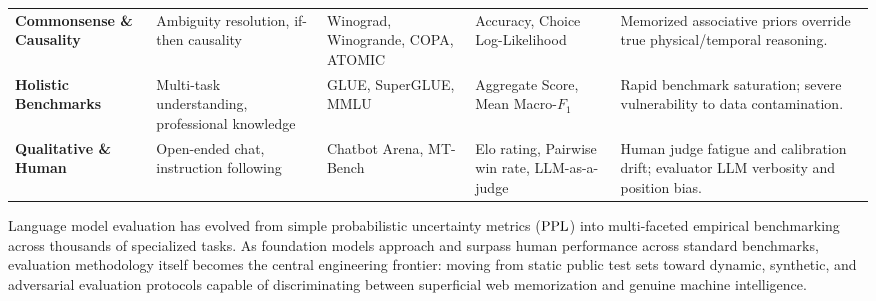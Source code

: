 \documentclass[../../main.tex]{subfiles}
\begin{document}
\begin{table}[htbp]
\begin{tabularx}{\textwidth}{l p{2.8cm} p{3.2cm} p{2.8cm} X}
\addlinespace
\textbf{Commonsense \& Causality} 
    & Ambiguity resolution, if-then causality & Winograd, Winogrande, COPA, ATOMIC & Accuracy, Choice Log-Likelihood & Memorized associative priors override true physical/temporal reasoning. \\
\addlinespace
\textbf{Holistic Benchmarks} 
    & Multi-task understanding, professional knowledge & GLUE, SuperGLUE, MMLU & Aggregate Score, Mean Macro-$F_1$ & Rapid benchmark saturation; severe vulnerability to data contamination. \\
\addlinespace
\textbf{Qualitative \& Human} 
    & Open-ended chat, instruction following & Chatbot Arena, MT-Bench & Elo rating, Pairwise win rate, LLM-as-a-judge & Human judge fatigue and calibration drift; evaluator LLM verbosity and position bias. \\
\bottomrule
\end{tabularx}
\end{table}


Language model evaluation has evolved from simple probabilistic uncertainty metrics ($\mathrm{PPL}$) into multi-faceted empirical benchmarking across thousands of specialized tasks. As foundation models approach and surpass human performance across standard benchmarks, evaluation methodology itself becomes the central engineering frontier: moving from static public test sets toward dynamic, synthetic, and adversarial evaluation protocols capable of discriminating between superficial web memorization and genuine machine intelligence.
\end{document}

